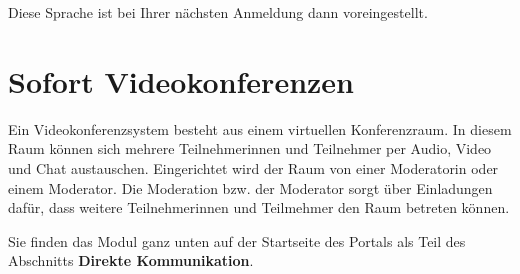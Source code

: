 \documentclass[
  letterpaper,
  DIV=11,
  numbers=noendperiod]{scrreprt}
\begin{document}
Diese Sprache ist bei Ihrer nächsten Anmeldung dann voreingestellt.

\chapter{Sofort Videokonferenzen}\label{sofort-videokonferenzen}

Ein Videokonferenzsystem besteht aus einem virtuellen Konferenzraum. In
diesem Raum können sich mehrere Teilnehmerinnen und Teilnehmer per
Audio, Video und Chat austauschen. Eingerichtet wird der Raum von einer
Moderatorin oder einem Moderator. Die Moderation bzw. der Moderator
sorgt über Einladungen dafür, dass weitere Teilnehmerinnen und
Teilmehmer den Raum betreten können.

Sie finden das Modul ganz unten auf der Startseite des Portals als Teil
des Abschnitts \textbf{Direkte Kommunikation}.
\end{document}
